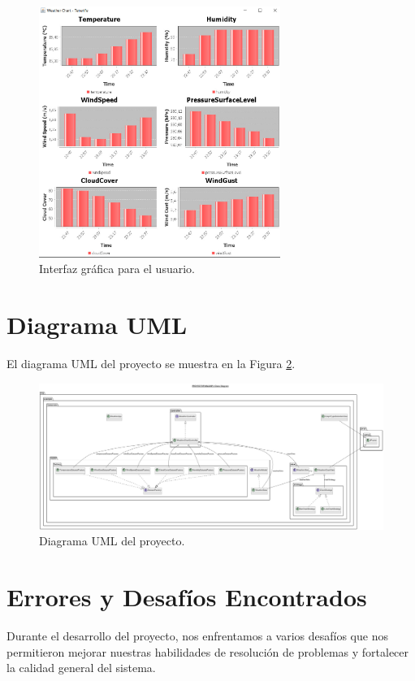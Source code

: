 \documentclass{article}
\begin{document}
\begin{figure}[H]
  \centering
  \includegraphics[width=0.7\textwidth]{images/image10.png}
  \caption{Interfaz gráfica para el usuario.}
  \label{fig:seleccion_ciudad4}
\end{figure}

\newpage 

\section{Diagrama UML}
El diagrama UML del proyecto se muestra en la Figura \ref{fig:uml}.


\begin{figure}[H]
    \centering
    \includegraphics[width=1.0\textwidth]{images/image0.png}
    \caption{Diagrama UML del proyecto.}
    \label{fig:uml}
\end{figure}

\section{Errores y Desafíos Encontrados}
Durante el desarrollo del proyecto, nos enfrentamos a varios desafíos que nos permitieron mejorar nuestras habilidades de resolución de problemas y fortalecer la calidad general del sistema.
\end{document}
